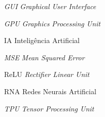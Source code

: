 \begin{siglas} %
	
	
	
	
	
	
	
	
	
	
	

	
	
	
	
	
	\item[\textit{GUI}] \textit{Graphical User Interface}
	\item[\textit{GPU}] \textit{Graphics Processing Unit}
	
	\item[IA] Inteligência Artificial
	
	
	
	
	\item[\textit{MSE}] \textit{Mean Squared Error}
	
	
	
	
	\item[ReLU] \textit{Rectifier Linear Unit}
	\item[RNA] Redes Neurais Artificial
	
	\item[\textit{TPU}] \textit{Tensor Processing Unit}
	
	
	
	
	
	

\end{siglas}


